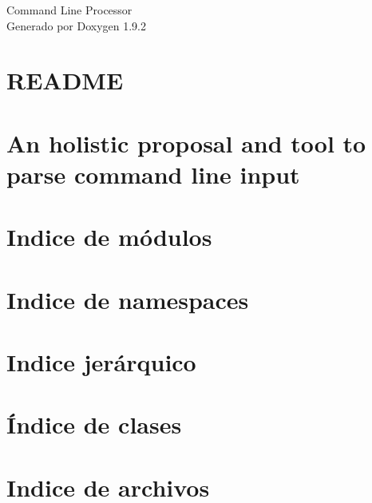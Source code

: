 \documentclass[twoside]{book}
\newcommand{\+}{\discretionary{\mbox{\scriptsize$\hookleftarrow$}}{}{}}
\newcommand{\clearemptydoublepage}{%
    \newpage{\pagestyle{empty}\cleardoublepage}%
  }
\begin{document}
  \raggedbottom
    \hypersetup{pageanchor=false,
                bookmarksnumbered=true,
                pdfencoding=unicode
               }
  \begin{titlepage}
  \vspace*{7cm}
  \begin{center}%
  {\Large Command Line Processor}\\
  \vspace*{1cm}
  {\large Generado por Doxygen 1.9.2}\\
  \end{center}
  \end{titlepage}
  \clearemptydoublepage
  \tableofcontents
  \clearemptydoublepage
  \hypersetup{pageanchor=true}
\chapter{README}
\label{md_docs_user_manual__r_e_a_d_m_e}

\chapter{An holistic proposal and tool to parse command line input}
\label{md__r_e_a_d_m_e}

\chapter{Indice de módulos}

\chapter{Indice de namespaces}

\chapter{Indice jerárquico}

\chapter{Índice de clases}

\chapter{Indice de archivos}

\end{document}
